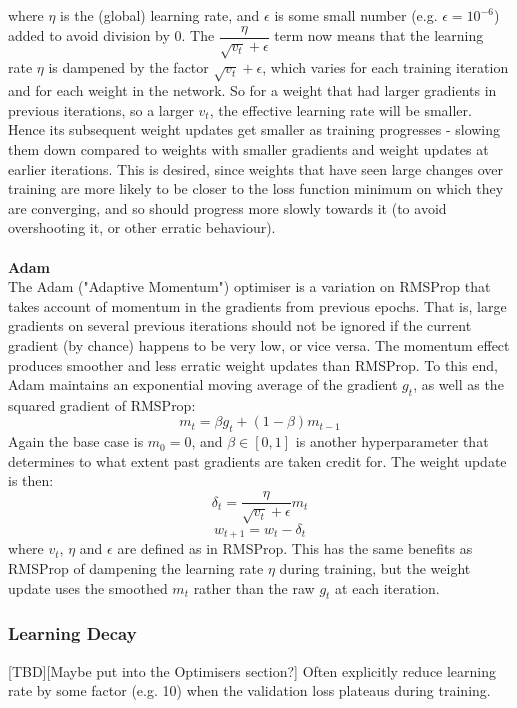 \documentclass[11pt]{article} %
\theoremstyle{plain}
\theoremstyle{definition}
\begin{document}
where \(\eta\) is the (global) learning rate, and \(\epsilon\) is some small number (e.g. \(\epsilon=10^{-6}\)) added to avoid division by 0. The \(\dfrac{\eta}{\sqrt{v_t} + \epsilon}\) term now means that the learning rate \(\eta\) is dampened by the factor \(\sqrt{v_t} + \epsilon\), which varies for each training iteration and for each weight in the network. So for a weight that had larger gradients in previous iterations, so a larger \(v_t\), the effective learning rate will be smaller. Hence its subsequent weight updates get smaller as training progresses - slowing them down compared to weights with smaller gradients and weight updates at earlier iterations. This is desired, since weights that have seen large changes over training are more likely to be closer to the loss function minimum on which they are converging, and so should progress more slowly towards it (to avoid overshooting it, or other erratic behaviour).
\\
\\
\noindent
\textbf{Adam}
\\
\noindent
The Adam ("Adaptive Momentum") optimiser is a variation on RMSProp that takes account of momentum in the gradients from previous epochs. That is, large gradients on several previous iterations should not be ignored if the current gradient (by chance) happens to be very low, or vice versa. The momentum effect produces smoother and less erratic weight updates than RMSProp. To this end, Adam maintains an exponential moving average of the gradient \(g_t\), as well as the squared gradient of RMSProp:
\[ m_t = \beta g_t + (1-\beta)m_{t-1} \]
Again the base case is \(m_0=0\), and \( \beta \in [0,1]\) is another hyperparameter that determines to what extent past gradients are taken credit for. The weight update is then:
\[ \delta_t  = \dfrac{\eta}{\sqrt{v_t} + \epsilon} m_t \]
\[ w_{t+1} = w_t - \delta_t \]
where \(v_t\), \(\eta\) and \(\epsilon\) are defined as in RMSProp. This has the same benefits as RMSProp of dampening the learning rate \(\eta\) during training, but the weight update uses the smoothed \(m_t\) rather than the raw \(g_t\) at each iteration. 

\subsubsection{Learning Decay}
[TBD][Maybe put into the Optimisers section?] Often explicitly reduce learning rate by some factor (e.g. 10) when the validation loss plateaus during training.
\end{document}
